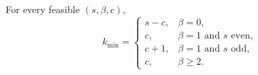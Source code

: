 \begin{corollary}
For every feasible \((s,\beta,c)\),
\[
 k_{\min}=
 \begin{cases}
 s-c,&\beta=0,\\
 c,&\beta=1\text{ and }s\text{ even},\\
 c+1,&\beta=1\text{ and }s\text{ odd},\\
 c,&\beta\ge2.
 \end{cases}
\]
\end{corollary}
